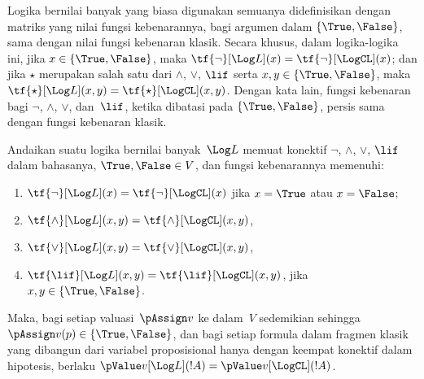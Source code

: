 \documentclass[../../../include/open-logic-section]{subfiles}
\begin{document}


Logika bernilai banyak yang biasa digunakan semuanya didefinisikan dengan
matriks yang nilai fungsi kebenarannya, bagi argumen dalam
$\{\True,\False\}$, sama dengan nilai fungsi kebenaran klasik. Secara khusus,
dalam logika-logika ini, jika $x\in\{\True,\False\}$, maka
$\tf{\lnot}[\Log L](x)=\tf{\lnot}[\LogCL](x)$; dan jika $\star$ merupakan
salah satu dari $\land$, $\lor$, $\lif$ serta
$x,y\in\{\True,\False\}$, maka
$\tf{\star}[\Log L](x,y)=\tf{\star}[\LogCL](x,y)$. Dengan kata lain,
fungsi kebenaran bagi $\lnot$, $\land$, $\lor$, dan~$\lif$, ketika dibatasi
pada $\{\True,\False\}$, persis sama dengan fungsi kebenaran klasik.

\begin{prop}
  Andaikan suatu logika bernilai banyak~$\Log L$ memuat konektif $\lnot$,
  $\land$, $\lor$, $\lif$ dalam bahasanya, $\True,\False\in V$, dan fungsi
  kebenarannya memenuhi:
  \begin{enumerate}
    \item{} $\tf{\lnot}[\Log L](x)=\tf{\lnot}[\LogCL](x)$
    jika $x=\True$ atau $x=\False$;
    \item{} $\tf{\land}[\Log L](x,y)=\tf{\land}[\LogCL](x,y)$,
    \item{} $\tf{\lor}[\Log L](x,y)=\tf{\lor}[\LogCL](x,y)$,
    \item{} $\tf{\lif}[\Log L](x,y)=\tf{\lif}[\LogCL](x,y)$,
    jika $x,y\in\{\True,\False\}$.
  \end{enumerate}
  Maka, bagi setiap valuasi~$\pAssign v$ ke dalam~$V$ sedemikian sehingga
  $\pAssign v(p)\in\{\True,\False\}$, dan bagi setiap formula dalam
  fragmen klasik yang dibangun dari variabel proposisional hanya dengan
  keempat konektif dalam hipotesis, berlaku
  $\pValue v[\Log L](!A)=\pValue v[\LogCL](!A)$.
\end{prop}
\end{document}
